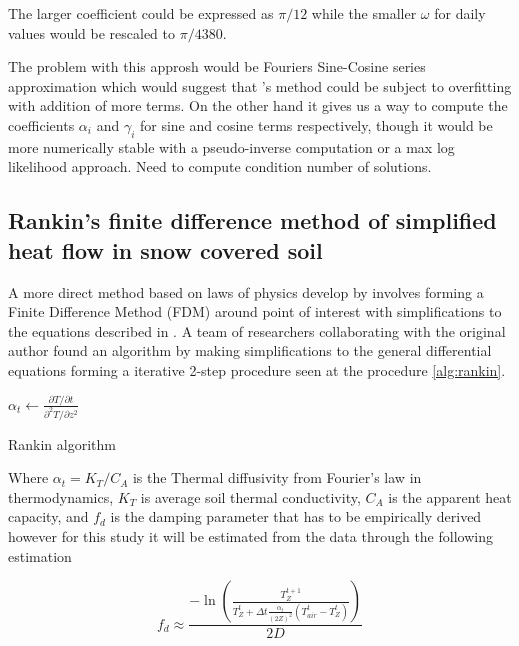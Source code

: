 The larger coefficient could be expressed as $\pi/12$ while the smaller $\omega$ for daily values would be rescaled to $\pi/4380$.

The problem with this approsh would be Fouriers Sine-Cosine series approximation which would suggest that \citeauthor{plauborg_simple_2002}'s method could be subject to overfitting with addition of more terms. On the other hand it gives us a way to compute the coefficients $\alpha_i$ and $\gamma_i$ for sine and cosine terms respectively, though it would be more numerically stable with a pseudo-inverse computation or a max log likelihood approach. \alert{Need to compute condition number of solutions.}

\subsection[Rankin algorithm]{Rankin's finite difference method of simplified heat flow in snow covered soil}\label{sec:theory:rankin}

A more direct method based on laws of physics develop by \citeauthor{karvonen_model_1988} involves forming a Finite Difference Method (FDM) around point of interest with simplifications to the equations described in . A team of researchers collaborating with the original author found an algorithm by making simplifications to the general differential equations forming a iterative 2-step procedure seen at the procedure \ref{alg:rankin}.

\begin{algorithm}[h]
	\SetAlgoLined
	$\alpha_t \gets \frac{\partial T / \partial t}{\partial^2 T / \partial z^2}$\;
	\caption{Rankin algorithm}
	\label{alg:rankin}
\end{algorithm}

Where $\alpha_t = K_T/C_A$ is the Thermal diffusivity from Fourier's law in thermodynamics, $K_T$ is average soil thermal conductivity, $C_A$ is the apparent heat capacity, and $f_d$ is the damping parameter that has to be empirically derived however for this study it will be estimated from the data through the following estimation

$$
f_d \approx \frac{-\ln\left(\frac{T_Z^{t+1}}{T_Z^t + \Delta t \frac{\alpha_t}{(2Z)^2} (T^t_{air}-T_Z^t)}\right)}{2D}
$$

